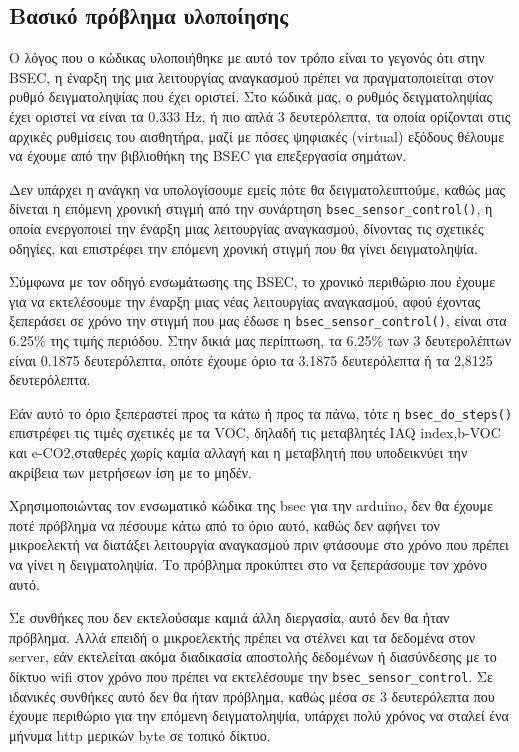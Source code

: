 \subsection{Βασικό πρόβλημα υλοποίησης}

Ο λόγος που ο κώδικας υλοποιήθηκε με αυτό τον τρόπο είναι το γεγονός ότι στην BSEC, η έναρξη της μια λειτουργίας αναγκασμού πρέπει να 
πραγματοποιείται στον ρυθμό δειγματοληψίας που έχει οριστεί. Στο κώδικά μας, ο ρυθμός δειγματοληψίας έχει οριστεί να είναι τα 0.333 Hz,
ή πιο απλά 3 δευτερόλεπτα, τα οποία ορίζονται στις αρχικές ρυθμίσεις του αισθητήρα, μαζί με πόσες ψηφιακές (virtual) εξόδους θέλουμε να έχουμε 
από την βιβλιοθήκη της BSEC για επεξεργασία σημάτων.

Δεν υπάρχει η ανάγκη να υπολογίσουμε εμείς πότε θα δειγματολειπτούμε, καθώς μας δίνεται η επόμενη χρονική στιγμή από την συνάρτηση \texttt{bsec\_sensor\_control()},
η οποία ενεργοποιεί την έναρξη μιας λειτουργίας αναγκασμού, δίνοντας τις σχετικές οδηγίες, και επιστρέφει την επόμενη χρονική στιγμή που θα γίνει δειγματοληψία.

Σύμφωνα με τον οδηγό ενσωμάτωσης της BSEC, το χρονικό περιθώριο που έχουμε για να εκτελέσουμε την έναρξη μιας νέας λειτουργίας αναγκασμού, αφού 
έχοντας ξεπεράσει σε χρόνο την στιγμή που μας έδωσε η \texttt{bsec\_sensor\_control()}, είναι στα 6.25\% της τιμής περιόδου.
Στην δικιά μας περίπτωση, τα 6.25\% των 3 δευτερολέπτων είναι 0.1875 δευτερόλεπτα, οπότε έχουμε όριο τα 3.1875 δευτερόλεπτα ή τα 2,8125 δευτερόλεπτα.

Εάν αυτό το όριο ξεπεραστεί προς τα κάτω ή προς τα πάνω, τότε η \texttt{bsec\_do\_steps()} επιστρέφει τις τιμές σχετικές με τα VOC,
δηλαδή τις μεταβλητές IAQ index,b-VOC και e-CO2,σταθερές χωρίς καμία αλλαγή και η μεταβλητή που υποδεικνύει την ακρίβεια των μετρήσεων ίση με το μηδέν.

Χρησιμοποιώντας τον ενσωματικό κώδικα της bsec για την arduino, δεν θα έχουμε ποτέ πρόβλημα να πέσουμε κάτω από το όριο αυτό, καθώς δεν αφήνει τον μικροελεκτή 
να διατάξει λειτουργία αναγκασμού πριν φτάσουμε στο χρόνο που πρέπει να γίνει η δειγματοληψία. Το πρόβλημα προκύπτει στο να ξεπεράσουμε τον χρόνο αυτό.

Σε συνθήκες που δεν εκτελούσαμε καμιά άλλη διεργασία, αυτό δεν θα ήταν πρόβλημα. Αλλά επειδή ο μικροελεκτής πρέπει να στέλνει και τα δεδομένα στον server,
εάν εκτελείται ακόμα διαδικασία αποστολής δεδομένων ή διασύνδεσης με το δίκτυο wifi στον χρόνο που πρέπει να εκτελέσουμε την \texttt{bsec\_sensor\_control}.
Σε ιδανικές συνθήκες αυτό δεν θα ήταν πρόβλημα, καθώς μέσα σε 3 δευτερόλεπτα που έχουμε περιθώριο για την επόμενη δειγματοληψία, 
υπάρχει πολύ χρόνος να σταλεί ένα μήνυμα http μερικών byte σε τοπικό δίκτυο.

